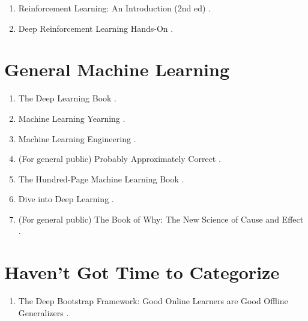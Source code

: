 \documentclass{article}
\begin{document}
\begin{enumerate}

\item Reinforcement Learning: An Introduction (2nd ed) \cite{Sutton2018}.

\item Deep Reinforcement Learning Hands-On \cite{Lapan2018}.

\end{enumerate}




\section{General Machine Learning}

\begin{enumerate}

\item The Deep Learning Book \cite{Goodfellow-et-al-2016}.

\item Machine Learning Yearning \cite{Ng2018}.

\item Machine Learning Engineering \cite{Burkov2020}.

\item (For general public) Probably Approximately Correct \cite{Valiant2013}.

\item The Hundred-Page Machine Learning Book \cite{Burkov2019}.

\item Dive into Deep Learning \cite{Zhang2021}.

\item (For general public) The Book of Why: The New Science of Cause and Effect \cite{Pearl2018}.

\end{enumerate}




\section{Haven't Got Time to Categorize}

\begin{enumerate}

\item The Deep Bootstrap Framework: Good Online Learners are Good Offline Generalizers \cite{nakkiran2021deep}.

\end{enumerate}
\end{document}
